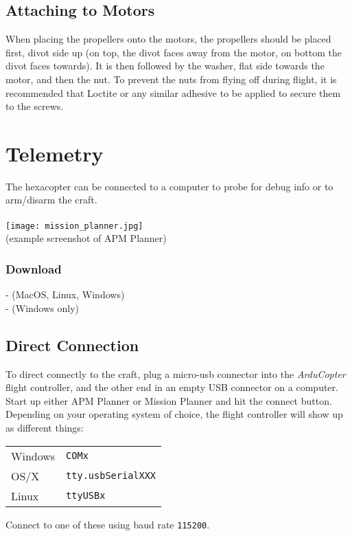 \documentclass{style}
\begin{document}
\subsection{Attaching to Motors}
When placing the propellers onto the motors, the propellers should be placed first, divot side up (on top, the divot faces away from the motor, on bottom the divot faces towards).
It is then followed by the washer, flat side towards the motor, and then the nut.
To prevent the nuts from flying off during flight, it is recommended that Loctite or any similar adhesive to be applied to secure them to the screws.
\section{Telemetry}
The hexacopter can be connected to a computer to probe for debug info or to arm/disarm the craft. \\ \\
\texttt{[image: mission\_planner.jpg]} \\
(example screenshot of APM Planner)
\subsubsection{Download}
 - (MacOS, Linux, Windows) \\
 - (Windows only)
\subsection{Direct Connection}
To direct connectly to the craft, plug a micro-usb connector into the \textit{ArduCopter} flight controller, and the other end in an empty USB connector on a computer.
Start up either APM Planner or Mission Planner and hit the connect button.
Depending on your operating system of choice, the flight controller will show up as different things:
\newline
\newline
\begin{tabular}{ l l }
  Windows & \texttt{COMx} \\
  OS/X & \texttt{tty.usbSerialXXX} \\
  Linux & \texttt{ttyUSBx}
\end{tabular}
\newline
\newline
Connect to one of these using baud rate \texttt{115200}.
\end{document}
